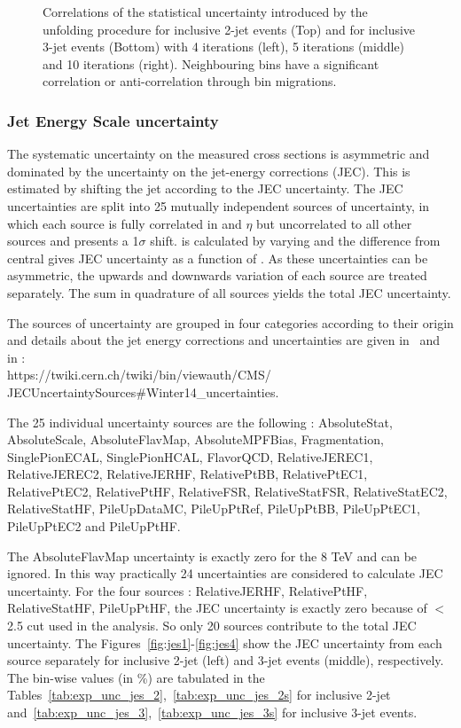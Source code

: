 \begin{figure}[!htbp]
\begin{center}
    \caption{Correlations of the statistical uncertainty introduced by the unfolding procedure for inclusive 2-jet events (Top) and for 
      inclusive 3-jet events (Bottom) with 4 iterations (left), 5 iterations (middle) and 10 iterations (right). Neighbouring bins have a 
      significant correlation or anti-correlation through bin migrations.}
    \label{fig:corr}
  \end{center}
\end{figure}

\subsubsection{Jet Energy Scale uncertainty}
The systematic uncertainty on the measured cross sections is asymmetric and dominated by the uncertainty on the jet-energy corrections (JEC). This is estimated by shifting the jet \pt according to the JEC uncertainty. The JEC uncertainties are split 
into 25 mutually independent sources of uncertainty, in which each source is fully correlated in \pt and $\eta$ but uncorrelated to all 
other sources and presents a 1$\sigma$ shift. \httwo is calculated by varying \pt and the difference from central \httwo gives JEC uncertainty as a function of \httwo. As these uncertainties can be asymmetric, the upwards and downwards variation of each source 
are treated separately. The sum in quadrature of all sources yields the total JEC uncertainty.

The sources of uncertainty are grouped in four categories according to their origin and details about the jet energy corrections and 
uncertainties are given in~\cite{bib:JES_2013} and in : \\
https://twiki.cern.ch/twiki/bin/viewauth/CMS/ JECUncertaintySources\#Winter14\_uncertainties. 

The 25 individual uncertainty sources are the following :
AbsoluteStat, AbsoluteScale, AbsoluteFlavMap, AbsoluteMPFBias, Fragmentation, SinglePionECAL, 
SinglePionHCAL, FlavorQCD, RelativeJEREC1, RelativeJEREC2, RelativeJERHF,
RelativePtBB, RelativePtEC1, RelativePtEC2, RelativePtHF, RelativeFSR, RelativeStatFSR, RelativeStatEC2,
RelativeStatHF, PileUpDataMC, PileUpPtRef, PileUpPtBB, PileUpPtEC1, PileUpPtEC2 and PileUpPtHF.

The AbsoluteFlavMap uncertainty is exactly zero for the 8 TeV and can be ignored. In this way practically 24 uncertainties are considered to calculate JEC uncertainty. For the four sources : RelativeJERHF, 
RelativePtHF, RelativeStatHF, PileUpPtHF, the JEC uncertainty is exactly zero because of  $<$ 2.5 cut used in the analysis. So only 20 sources contribute to the total JEC uncertainty. The Figures~\ref{fig:jes1}-\ref{fig:jes4} show the JEC uncertainty from each 
source separately for inclusive 2-jet (left) and 3-jet events (middle), respectively. The bin-wise values (in \%) are tabulated in the Tables~\ref{tab:exp_unc_jes_2},~\ref{tab:exp_unc_jes_2s} for inclusive 2-jet and~\ref{tab:exp_unc_jes_3},~\ref{tab:exp_unc_jes_3s} for inclusive 3-jet events. 


